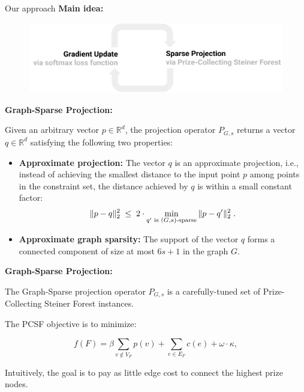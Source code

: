 \documentclass[svgnames,final]{beamer}
\newcommand{\R}{\ensuremath{\mathbb{R}}}
\begin{document}
\begin{frame}
\begin{columns}[T]
\begin{column}{.3\linewidth}
\begin{block}{Our approach}
		\textbf{Main idea:}

		\begin{figure}[h]
		\centering
		\includegraphics[width=\linewidth]{images/algo.pdf}
		\label{fig:test}
		\end{figure}


		\vspace{2cm}

		\textbf{Graph-Sparse Projection:}

		Given an arbitrary vector $p \in \R^d$, the projection operator $P_{G,s}$
		returns a vector $q \in \R^d$ satisfying the following two properties:
		\begin{itemize}
		\item \textbf{Approximate projection:} The vector $q$ is an approximate projection,
					i.e., instead of achieving the smallest distance to the input point $p$ among points in the constraint set,
					the distance achieved by $q$ is within a small constant factor:
		\begin{equation}
		\label{eq:approxproj}
		  \|p - q \|_2^2  \; \leq \; 2 \cdot \min_{q' \textnormal{ is } (G,s)\textnormal{-sparse}} \| p - q'\|_2^2 \; .
		\end{equation}
		\item \textbf{Approximate graph sparsity:} The support of the vector $q$ forms
					a connected component of size at most $6s + 1$ in the graph $G$.
		\end{itemize}


		\vspace{2cm}

		\textbf{Graph-Sparse Projection:}

		The Graph-Sparse projection operator $P_{G,s}$ is a carefully-tuned set of Prize-Collecting Steiner Forest instances.

		The PCSF objective is to minimize:

		\begin{equation}
			f(F) = \beta \sum_{v\notin V_F} p(v) + \sum_{e\in E_F} c(e) + \omega \cdot \kappa,
		\end{equation}

		Intuitively, the goal is to pay as little edge cost to connect the highest prize nodes.




\end{block}
\end{column}
\end{columns}
\end{frame}
\end{document}
